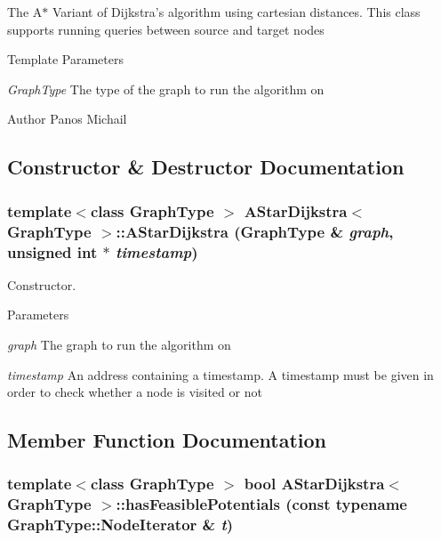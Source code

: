 The A$\ast$ Variant of Dijkstra's algorithm using cartesian distances. This class supports running queries between source and target nodes


\begin{DoxyTemplParams}{Template Parameters}
\item[{\em GraphType}]The type of the graph to run the algorithm on \end{DoxyTemplParams}
\begin{DoxyAuthor}{Author}
Panos Michail 
\end{DoxyAuthor}


\subsection{Constructor \& Destructor Documentation}
\hypertarget{class_a_star_dijkstra_a3537728567fd96dd0e934e953de24a9a}{
\subsubsection[{AStarDijkstra}]{\setlength{\rightskip}{0pt plus 5cm}template$<$class GraphType $>$ {\bf AStarDijkstra}$<$ GraphType $>$::{\bf AStarDijkstra} (GraphType \& {\em graph}, \/  unsigned int $\ast$ {\em timestamp})}}
\label{class_a_star_dijkstra_a3537728567fd96dd0e934e953de24a9a}


Constructor. 


\begin{DoxyParams}{Parameters}
\item[{\em graph}]The graph to run the algorithm on \item[{\em timestamp}]An address containing a timestamp. A timestamp must be given in order to check whether a node is visited or not \end{DoxyParams}


\subsection{Member Function Documentation}
\hypertarget{class_a_star_dijkstra_a382abeb0b9328f55ce3ecf21e5c937d8}{
\subsubsection[{hasFeasiblePotentials}]{\setlength{\rightskip}{0pt plus 5cm}template$<$class GraphType $>$ bool {\bf AStarDijkstra}$<$ GraphType $>$::hasFeasiblePotentials (const typename GraphType::NodeIterator \& {\em t})}}
\label{class_a_star_dijkstra_a382abeb0b9328f55ce3ecf21e5c937d8}



